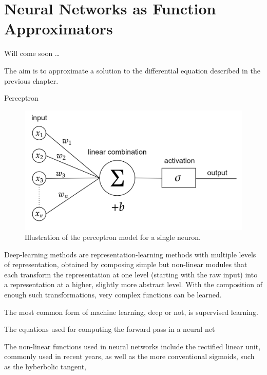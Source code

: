 \section{Neural Networks as Function Approximators}
Will come soon \ldots

The aim is to approximate a solution to the differential equation described in the previous chapter.  

Perceptron

\begin{figure}[H]
    \begin{center}
        \includegraphics[scale=0.3]{img/diagram-20220205_1.png}
    \end{center}
    \caption{Illustration of the perceptron model for a single neuron.}
    \label{fig4}
\end{figure}



Deep-learning methods are 
representation-learning methods with multiple levels of representation, obtained by composing simple but non-linear modules that each 
transform the representation at one level (starting with the raw input) 
into a representation at a higher, slightly more abstract level. With the 
composition of enough such transformations, very complex functions 
can be learned.

The most common form of machine learning, deep or not, is supervised learning.

The 
equations used for computing the forward pass in a neural net

The non-linear functions used in neural networks include the rectified 
linear unit, commonly used in recent years, as 
well as the more conventional sigmoids, such as the hyberbolic tangent, 


